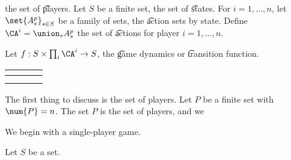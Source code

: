  the set of \t{players}.
Let $S$ be a finite set, the set of \t{states}.
For $i = 1, \dots, n$, let $\set{A^p_s}_{s \in S}$ be a family of sets, the \t{action sets by state}.
Define $\CA^i = \union_s A^p_s$ the set of \t{actions} for player $i = 1, \dots, n$.

Let $f: S \times \prod_{i} \CA^i \to S$, the \t{game dynamics} or \t{transition function}.

{\tiny
\begin{tabular}{c|c|c}
	 & $\;\,$ & $\;\,$ \\
	\hline
	& & \\
	\hline	
	& & 
\end{tabular}
}






The first thing to discuss is the set of players.
Let $P$ be a finite set with $\num{P} = n$.
The set $P$ is the set of players, and we

We begin with a single-player game.

Let $S$ be a set.

\blankpage
